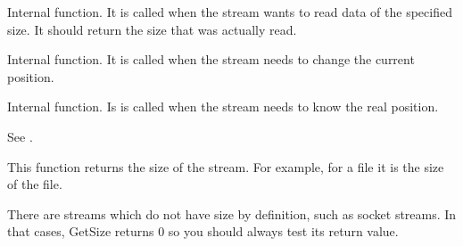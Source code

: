 \label{wxstreambaseonsysread}


Internal function. It is called when the stream wants to read data of the
specified size. It should return the size that was actually read.



Internal function. It is called when the stream needs to change the
current position.



Internal function. Is is called when the stream needs to know the
real position.



See .

\label{wxstreambasegetsize}


This function returns the size of the stream. For example, for a file it is the size of
the file.


There are streams which do not have size by definition, such as socket streams.
In that cases, GetSize returns $0$ so you should always test its return value.


